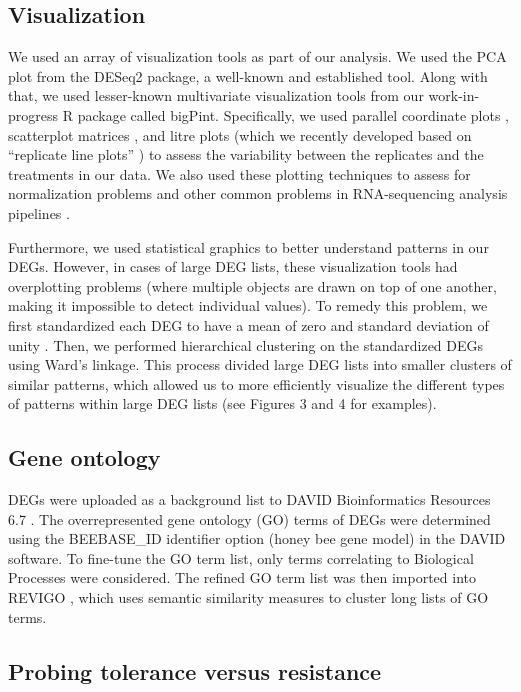 \documentclass{bmcart}
\begin{document}
\begin{linenumbers}
\begin{doublespacing}
\subsection*{Visualization}

We used an array of visualization tools as part of our analysis. We used the PCA plot \cite{pca} from the DESeq2 package, a well-known and established tool. Along with that, we used lesser-known multivariate visualization tools from our work-in-progress R package called bigPint. Specifically, we used parallel coordinate plots \cite{origPCP}, scatterplot matrices \cite{scatMat}, and litre plots (which we recently developed based on ``replicate line plots'' \cite{jds}) to assess the variability between the replicates and the treatments in our data. We also used these plotting techniques to assess for normalization problems and other common problems in RNA-sequencing analysis pipelines \cite{jds}.

Furthermore, we used statistical graphics to better understand patterns in our DEGs. However, in cases of large DEG lists, these visualization tools had overplotting problems (where multiple objects are drawn on top of one another, making it impossible to detect individual values). To remedy this problem, we first standardized each DEG to have a mean of zero and standard deviation of unity \cite{Chandrasekhar, deSouto}. Then, we performed hierarchical clustering on the standardized DEGs using Ward's linkage. This process divided large DEG lists into smaller clusters of similar patterns, which allowed us to more efficiently visualize the different types of patterns within large DEG lists (see Figures 3 and 4 for examples).

\subsection*{Gene ontology}

DEGs were uploaded as a background list to DAVID Bioinformatics Resources 6.7 \cite{davidBio, davidBio2}. The overrepresented gene ontology (GO) terms of DEGs were determined using the BEEBASE\_ID identifier option (honey bee gene model) in the DAVID software. To fine-tune the GO term list, only terms correlating to Biological Processes were considered. The refined GO term list was then imported into REVIGO \cite{revigo}, which uses semantic similarity measures to cluster long lists of GO terms.

\subsection*{Probing tolerance versus resistance}


\end{doublespacing}
\end{linenumbers}
\end{document}
